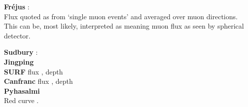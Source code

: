 \documentclass{article}
\begin{document}
\textbf{Fr\'ejus} \cite{PhysRevD.40.2163}:\\
Flux quoted as from `single muon events' and averaged over muon
directions. This can be, most likely, interpreted as meaning muon flux
as seen by spherical detector.

\textbf{Sudbury} \cite{PhysRevD.80.012001}:\\

\textbf{Jingping} \cite{Guo.2021}\\

\textbf{SURF} flux \cite{ABGRALL201770}, depth \cite{PhysRevD.27.1444}\\

\textbf{Canfranc} flux \cite{Trzaska2019}, depth \cite{Canfranc2005}\\

\textbf{Pyhasalmi} \cite{ENQVIST2005286}\\

Red curve \cite{Kudryavtsev:2008qh}.



\printbibliography

\end{document}
